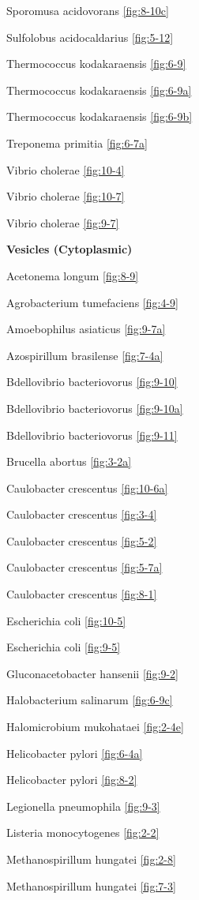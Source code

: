 \documentclass[]{tufte-book}
\begin{document}
Sporomusa acidovorans \ref{fig:8-10c}

Sulfolobus acidocaldarius \ref{fig:5-12}

Thermococcus kodakaraensis \ref{fig:6-9}

Thermococcus kodakaraensis \ref{fig:6-9a}

Thermococcus kodakaraensis \ref{fig:6-9b}

Treponema primitia \ref{fig:6-7a}

Vibrio cholerae \ref{fig:10-4}

Vibrio cholerae \ref{fig:10-7}

Vibrio cholerae \ref{fig:9-7}

\textbf{Vesicles (Cytoplasmic)}

Acetonema longum \ref{fig:8-9}

Agrobacterium tumefaciens \ref{fig:4-9}

Amoebophilus asiaticus \ref{fig:9-7a}

Azospirillum brasilense \ref{fig:7-4a}

Bdellovibrio bacteriovorus \ref{fig:9-10}

Bdellovibrio bacteriovorus \ref{fig:9-10a}

Bdellovibrio bacteriovorus \ref{fig:9-11}

Brucella abortus \ref{fig:3-2a}

Caulobacter crescentus \ref{fig:10-6a}

Caulobacter crescentus \ref{fig:3-4}

Caulobacter crescentus \ref{fig:5-2}

Caulobacter crescentus \ref{fig:5-7a}

Caulobacter crescentus \ref{fig:8-1}

Escherichia coli \ref{fig:10-5}

Escherichia coli \ref{fig:9-5}

Gluconacetobacter hansenii \ref{fig:9-2}

Halobacterium salinarum \ref{fig:6-9c}

Halomicrobium mukohataei \ref{fig:2-4e}

Helicobacter pylori \ref{fig:6-4a}

Helicobacter pylori \ref{fig:8-2}

Legionella pneumophila \ref{fig:9-3}

Listeria monocytogenes \ref{fig:2-2}

Methanospirillum hungatei \ref{fig:2-8}

Methanospirillum hungatei \ref{fig:7-3}
\end{document}
